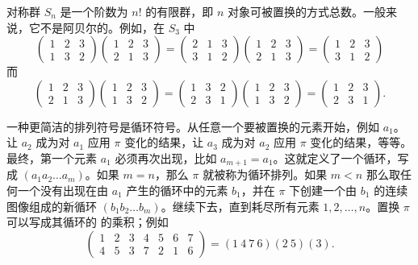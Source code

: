 \documentclass[hyperref,UTF8]{ctexbook}
\begin{document}
对称群 $S_n$ 是一个阶数为 $n!$ 的有限群，即 $n$ 对象可被置换的方式总数。一般来说，它不是阿贝尔的。例如，在 $S_3$ 中
$$
\left(\begin{array}{lll}
1 & 2 & 3 \\
1 & 3 & 2
\end{array}\right)\left(\begin{array}{lll}
1 & 2 & 3 \\
2 & 1 & 3
\end{array}\right)=\left(\begin{array}{lll}
2 & 1 & 3 \\
3 & 1 & 2
\end{array}\right)\left(\begin{array}{lll}
1 & 2 & 3 \\
2 & 1 & 3
\end{array}\right)=\left(\begin{array}{lll}
1 & 2 & 3 \\
3 & 1 & 2
\end{array}\right)
$$
而
$$
\left(\begin{array}{lll}
1 & 2 & 3 \\
2 & 1 & 3
\end{array}\right)\left(\begin{array}{lll}
1 & 2 & 3 \\
1 & 3 & 2
\end{array}\right)=\left(\begin{array}{lll}
1 & 3 & 2 \\
2 & 3 & 1
\end{array}\right)\left(\begin{array}{lll}
1 & 2 & 3 \\
1 & 3 & 2
\end{array}\right)=\left(\begin{array}{lll}
1 & 2 & 3 \\
2 & 3 & 1
\end{array}\right) .
$$

一种更简洁的排列符号是循环符号。从任意一个要被置换的元素开始，例如 $a_1$。让 $a_2$ 成为对 $a_1$ 应用 $\pi$ 变化的结果，让 $a_3$ 成为对 $a_2$ 应用 $\pi$ 变化的结果，等等。最终，第一个元素 $a_1$ 必须再次出现，比如 $a_{m+1}=a_1$。这就定义了一个循环，写成 $\left(a_1 a_2\ldots a_m\right)$。如果 $m=n$，那么 $\pi$ 就被称为循环排列。如果 $m<n$ 那么取任何一个没有出现在由 $a_1$ 产生的循环中的元素 $b_1$，并在 $\pi$ 下创建一个由 $b_1$ 的连续图像组成的新循环 $\left(b_1 b_2\ldots b_m\right)$。继续下去，直到耗尽所有元素 $1, 2,\dots, n$。置换 \(\pi\)可以写成其循环的 的乘积；例如
$$
\begin{pmatrix}1&2&3&4&5&6&7\\4&5&3&7&2&1&6\end{pmatrix}=(1\:4\:7\:6)(2\:5)(3).
$$
\end{document}
